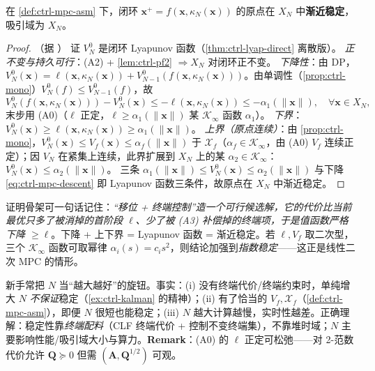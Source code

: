 \begin{theorem}
\label{thm:ctrl-mpc-main}
在 \cref{def:ctrl-mpc-asm} 下，闭环 $\mathbf{x}^+=f(\mathbf{x},\kappa_N(\mathbf{x}))$ 的原点在 $X_N$ 中\textbf{渐近稳定}，吸引域为 $X_N$\cite{rawlings2020mpc,borrelli2017predictive}。
\end{theorem}
\begin{proof}（据 \cite{rawlings2020mpc,borrelli2017predictive}）
证 $V_N^0$ 是闭环 Lyapunov 函数（\cref{thm:ctrl-lyap-direct} 离散版）。
\emph{正不变与持久可行}：(A2) + \cref{lem:ctrl-pf2} $\Rightarrow X_N$ 对闭环正不变。
\emph{下降性}：由 DP，$V_N^0(\mathbf{x})=\ell(\mathbf{x},\kappa_N(\mathbf{x}))+V_{N-1}^0(f(\mathbf{x},\kappa_N(\mathbf{x})))$。由单调性（\cref{prop:ctrl-mono}）$V_N^0(f)\le V_{N-1}^0(f)$，故
\begin{equation}
  V_N^0(f(\mathbf{x},\kappa_N(\mathbf{x})))-V_N^0(\mathbf{x})\le-\ell(\mathbf{x},\kappa_N(\mathbf{x}))\le-\alpha_1(\|\mathbf{x}\|),\quad\forall\mathbf{x}\in X_N,
  \label{eq:ctrl-mpc-descent}
\end{equation}
末步用 (A0)（$\ell$ 正定，$\ell\ge\alpha_1(\|\mathbf{x}\|)$ 某 $\mathcal{K}_\infty$ 函数 $\alpha_1$）。
\emph{下界}：$V_N^0(\mathbf{x})\ge\ell(\mathbf{x},\kappa_N(\mathbf{x}))\ge\alpha_1(\|\mathbf{x}\|)$。
\emph{上界（原点连续）}：由 \cref{prop:ctrl-mono}，$V_N^0(\mathbf{x})\le V_f(\mathbf{x})\le\alpha_f(\|\mathbf{x}\|)$ 于 $\mathcal{X}_f$（$\alpha_f\in\mathcal{K}_\infty$，由 (A0) $V_f$ 连续正定）；因 $V_N$ 在紧集上连续，此界扩展到 $X_N$ 上的某 $\alpha_2\in\mathcal{K}_\infty$：$V_N^0(\mathbf{x})\le\alpha_2(\|\mathbf{x}\|)$。
三条 $\alpha_1(\|\mathbf{x}\|)\le V_N^0(\mathbf{x})\le\alpha_2(\|\mathbf{x}\|)$ 与下降 \cref{eq:ctrl-mpc-descent} 即 Lyapunov 函数三条件，故原点在 $X_N$ 中渐近稳定。
\end{proof}

\begin{insight}
证明骨架可一句话记住：\emph{“移位 + 终端控制”造一个可行候选解，它的代价比当前最优只多了被消掉的首阶段 $\ell$、少了被 (A3) 补偿掉的终端项，于是值函数严格下降 $\ge\ell$}。下降 + 上下界 = Lyapunov 函数 = 渐近稳定。若 $\ell,V_f$ 取二次型，三个 $\mathcal{K}_\infty$ 函数可取幂律 $\alpha_i(s)=c_is^2$，则结论加强到\emph{指数稳定}——这正是线性二次 MPC 的情形。
\end{insight}

\begin{pitfall}
新手常把 $N$ 当“越大越好”的旋钮。事实：(i) 没有终端代价/终端约束时，单纯增大 $N$ \emph{不保证}稳定（\cref{ex:ctrl-kalman} 的精神）；(ii) 有了恰当的 $V_f,\mathcal{X}_f$（\cref{def:ctrl-mpc-asm}），即便 $N$ 很短也能稳定；(iii) $N$ 越大计算越慢，实时性越差。正确理解：稳定性靠\emph{终端配料}（CLF 终端代价 + 控制不变终端集），不靠堆时域；$N$ 主要影响性能/吸引域大小与算力。\textbf{Remark}：(A0) 的 $\ell$ 正定可松弛——对 2-范数代价允许 $\mathbf{Q}\succeq0$ 但需 $(\mathbf{A},\mathbf{Q}^{1/2})$ 可观。
\end{pitfall}

